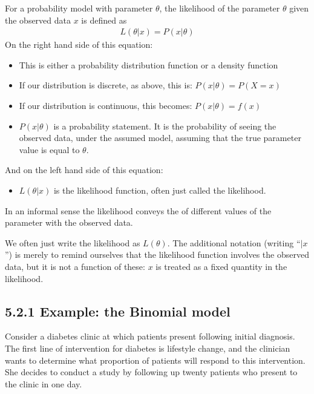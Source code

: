 \documentclass[letterpaper,10pt,english]{jupyterBook}
\begin{document}
\sphinxAtStartPar
For a probability model with parameter \(\theta\), the likelihood of the parameter \(\theta\) given the observed data \(x\) is defined as
\begin{equation*}
\begin{split}
L(\theta | x) = P(x | \theta)
\end{split}
\end{equation*}
\sphinxAtStartPar
On the right hand side of this equation:
\begin{itemize}
\item {} 
\sphinxAtStartPar
This is either a probability distribution function or a density function

\item {} 
\sphinxAtStartPar
If our distribution is discrete, as above, this is: \(P(x | \theta) = P(X=x)\)

\item {} 
\sphinxAtStartPar
If our distribution is continuous, this becomes: \(P(x | \theta) = f(x)\)

\item {} 
\sphinxAtStartPar
\(P(x | \theta)\) is a probability statement. It is the probability of seeing the observed data, under the assumed model, assuming that the true parameter value is equal to \(\theta\).

\end{itemize}

\sphinxAtStartPar
And on the left hand side of this equation:
\begin{itemize}
\item {} 
\sphinxAtStartPar
\(L(\theta | x)\) is the likelihood function, often just called the likelihood.

\end{itemize}

\sphinxAtStartPar
In an informal sense the likelihood conveys the  of different values of the parameter with the observed data.

\sphinxAtStartPar
We often just write the likelihood as \(L(\theta)\). The additional notation (writing “\(| x\)”) is merely to remind ourselves that the likelihood function involves the observed data, but it is not a function of these: \(x\) is treated as a fixed quantity in the likelihood.


\subsection{5.2.1 Example: the Binomial model}
\label{\detokenize{05.c. Likelihood:example-the-binomial-model}}
\sphinxAtStartPar
Consider a diabetes clinic at which patients present following initial diagnosis. The first line of intervention for diabetes is lifestyle change, and the clinician wants to determine what proportion of patients will respond to this intervention. She decides to conduct a study by following up twenty patients who present to the clinic in one day.
\end{document}
